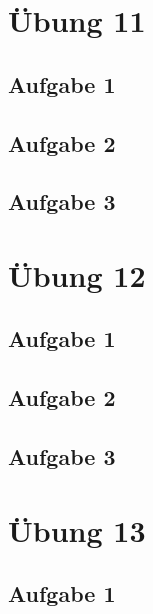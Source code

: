 \documentclass[a4paper]{article}
\begin{document}
\section{Übung 11}
\subsection{Aufgabe 1}
\textit{}

\subsection{Aufgabe 2}
\textit{}


\subsection{Aufgabe 3}
\textit{}




\newpage
\section{Übung 12}
\subsection{Aufgabe 1}
\textit{}

\subsection{Aufgabe 2}
\textit{}


\subsection{Aufgabe 3}
\textit{}




\newpage
\section{Übung 13}
\subsection{Aufgabe 1}
\textit{}
\end{document}
